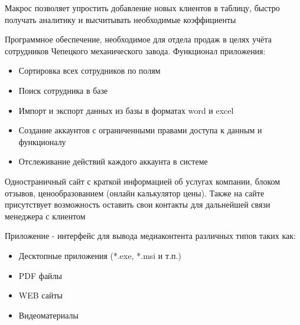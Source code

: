 \documentclass[10pt,a4paper,ragged2e,withhyper]{altacv}
\begin{document}

Макрос позволяет упростить добавление новых клиентов в таблицу, быстро получать аналитику и высчитывать необходимые коэффициенты

\divider

Программное обеспечение, необходимое для отдела продаж в целях учёта сотрудников Чепецкого механического завода. Функционал приложения:
\begin{itemize}
\item Сортировка всех сотрудников по полям
\item Поиск сотрудника в базе
\item Импорт и экспорт данных из базы в форматах word и excel
\item Создание аккаунтов с ограниченными правами доступа к данным и функционалу
\item Отслеживание действий каждого аккаунта в системе
\end{itemize}

\divider

Одностраничный сайт с краткой информацией об услугах компании, блоком отзывов, ценообразованием (онлайн калькулятор цены). Также на сайте присутствует возможность оставить свои контакты для дальнейшей связи менеджера с клиентом

\divider

Приложение - интерфейс для вывода медиаконтента различных типов таких как:
\begin{itemize}
\item Десктопные приложения (*.exe, *.msi и т.п.)
\item PDF файлы
\item WEB сайты
\item Видеоматериалы
\end{itemize}

\divider
\end{document}
